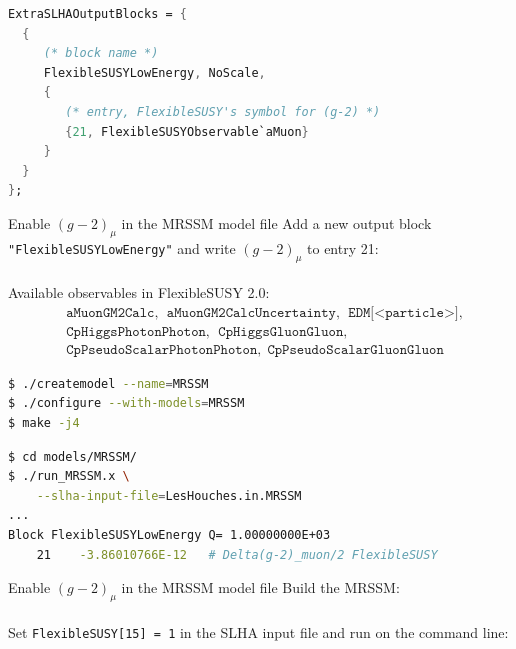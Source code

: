 \documentclass[hyperref={pdfpagelabels=false},ngerman]{beamer}
\begin{document}
\begin{lrbox}{\listbox}\begin{lstlisting}[language=Mathematica]
ExtraSLHAOutputBlocks = {
  {
     (* block name *)
     FlexibleSUSYLowEnergy, NoScale,
     {
        (* entry, FlexibleSUSY's symbol for (g-2) *)
        {21, FlexibleSUSYObservable`aMuon}
     }
  }
};
\end{lstlisting}\end{lrbox} %

\begin{frame}{Enable $(g-2)_\mu$ in the MRSSM model file}
  Add a new output block \texttt{"FlexibleSUSYLowEnergy"} and write
  $(g-2)_\mu$ to entry 21:
  \\[2em]
  \usebox{\listbox}
  \\[1em]
  Available observables in FlexibleSUSY 2.0:
  \begin{align*}
    &\texttt{aMuonGM2Calc},\ \ \texttt{aMuonGM2CalcUncertainty},\ \ \texttt{EDM[<particle>]},\\
    &\texttt{CpHiggsPhotonPhoton},\ \ \texttt{CpHiggsGluonGluon},\\
    &\texttt{CpPseudoScalarPhotonPhoton},\ \ \texttt{CpPseudoScalarGluonGluon}
  \end{align*}
\end{frame}

\begin{lrbox}{\listbox}\begin{lstlisting}[language=bash]
$ ./createmodel --name=MRSSM
$ ./configure --with-models=MRSSM
$ make -j4
\end{lstlisting}\end{lrbox} %

\begin{lrbox}{\listboxt}\begin{lstlisting}[language=bash]
$ cd models/MRSSM/
$ ./run_MRSSM.x \
    --slha-input-file=LesHouches.in.MRSSM
...
Block FlexibleSUSYLowEnergy Q= 1.00000000E+03
    21    -3.86010766E-12   # Delta(g-2)_muon/2 FlexibleSUSY
\end{lstlisting}\end{lrbox} %

\begin{frame}{Enable $(g-2)_\mu$ in the MRSSM model file}
  Build the MRSSM:\\[1.5em]
  \usebox{\listbox}
  \\[1em]
  Set \texttt{FlexibleSUSY[15] = 1} in the SLHA input file and run on
  the command line:
  \\[1.5em]
  \usebox{\listboxt}
\end{frame}
\end{document}
